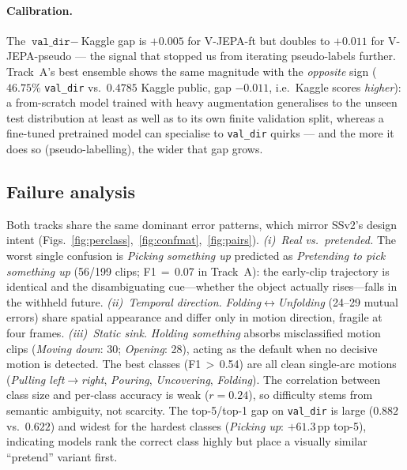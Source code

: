 \documentclass[10pt,twocolumn,letterpaper]{article}
\begin{document}
\paragraph{Calibration.}
The $\texttt{val\_dir}{-}$Kaggle gap is $+0.005$ for V-JEPA-ft but doubles to
$+0.011$ for V-JEPA-pseudo --- the signal that stopped us from iterating
pseudo-labels further. Track~A's best ensemble shows the same magnitude with
the \emph{opposite} sign ($46.75\%$ \texttt{val\_dir} vs.\ $0.4785$ Kaggle
public, gap $-0.011$, i.e.\ Kaggle scores \emph{higher}): a from-scratch model
trained with heavy augmentation generalises to the unseen test distribution at
least as well as to its own finite validation split, whereas a fine-tuned
pretrained model can specialise to \texttt{val\_dir} quirks --- and the more
it does so (pseudo-labelling), the wider that gap grows.

\subsection{Failure analysis}
\label{sec:failure}
Both tracks share the same dominant error patterns, which mirror SSv2's design
intent (Figs.~\ref{fig:perclass},~\ref{fig:confmat},~\ref{fig:pairs}).
\emph{(i)~Real vs.\ pretended.} The worst single confusion is \emph{Picking
something up} predicted as \emph{Pretending to pick something up} (56/199 clips;
F1\,$=$\,0.07 in Track~A): the early-clip trajectory is identical and the
disambiguating cue---whether the object actually rises---falls in the withheld
future. \emph{(ii)~Temporal direction.} \emph{Folding}$\leftrightarrow$\emph{Unfolding}
(24--29 mutual errors) share spatial appearance and differ only in motion
direction, fragile at four frames. \emph{(iii)~Static sink.} \emph{Holding
something} absorbs misclassified motion clips (\emph{Moving down}: 30;
\emph{Opening}: 28), acting as the default when no decisive motion is detected.
The best classes (F1\,$>$\,0.54) are all clean single-arc motions
(\emph{Pulling left$\rightarrow$right}, \emph{Pouring}, \emph{Uncovering},
\emph{Folding}). The correlation between class size and per-class accuracy is
weak ($r{=}0.24$), so difficulty stems from semantic ambiguity, not scarcity.
The top-5/top-1 gap on \texttt{val\_dir} is large ($0.882$ vs.\ $0.622$) and
widest for the hardest classes (\emph{Picking up}: $+61.3$\,pp top-5), indicating
models rank the correct class highly but place a visually similar ``pretend''
variant first.
\end{document}
